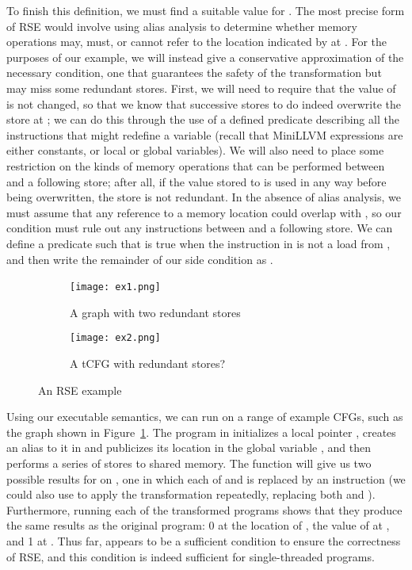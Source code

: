 \documentclass{eptcs}
\begin{document}
To finish this definition, we must find a suitable value for .
The most precise form of RSE would involve using alias analysis to determine whether memory operations may, must, or cannot refer to the location indicated by  at . For the purposes of our example, we will instead give a conservative approximation of the necessary condition, one that guarantees the safety of the transformation but may miss some redundant stores. First, we will need to require that the value of  is not changed, so that we know that successive stores to  do indeed overwrite the store at ; we can do this through the use of a defined  predicate describing all the instructions that might redefine a variable (recall that MiniLLVM expressions are either constants, or local or global variables). 
 We will also need to place some restriction on the kinds of memory operations that can be performed between  and a following store; after all, if the value stored to  is used in any way before being overwritten, the store is not redundant. In the absence of alias analysis, we must assume that any reference to a memory location could overlap with , so our condition must rule out any  instructions between  and a following store. We can define a predicate  such that  is true when the instruction in  is not a load from , and then write the remainder of our side condition as .

\begin{figure}[htb]
\begin{subfigure}[b]{0.35\textwidth}
\centering
\texttt{[image: ex1.png]}\ \ \caption{A graph with two redundant stores}
\label{ex1}
\end{subfigure}
\quad
\begin{subfigure}[b]{0.5\textwidth}
\texttt{[image: ex2.png]}
\caption{A \ac{tCFG} with redundant stores?\qquad}
\label{ex2}
\end{subfigure}
\caption{An RSE example}
\end{figure} 

Using our executable semantics, we can run  on a range of example \acp{CFG}, such as the graph  shown in Figure~\ref{ex1}. The program in  initializes a local pointer , creates an alias to it in  and publicizes its location in the global variable , and then performs a series of stores to shared memory.
The  function will give us two possible results for  on , one in which each of  and  is replaced by an  instruction (we could also use  to apply the transformation repeatedly, replacing both  and ). Furthermore, running each of the transformed programs shows that they produce the same results as the original program: 0 at the location of , the value of  at , and 1 at . Thus far,  appears to be a sufficient condition to ensure the correctness of RSE, and this condition is indeed sufficient for single-threaded programs.
\end{document}
